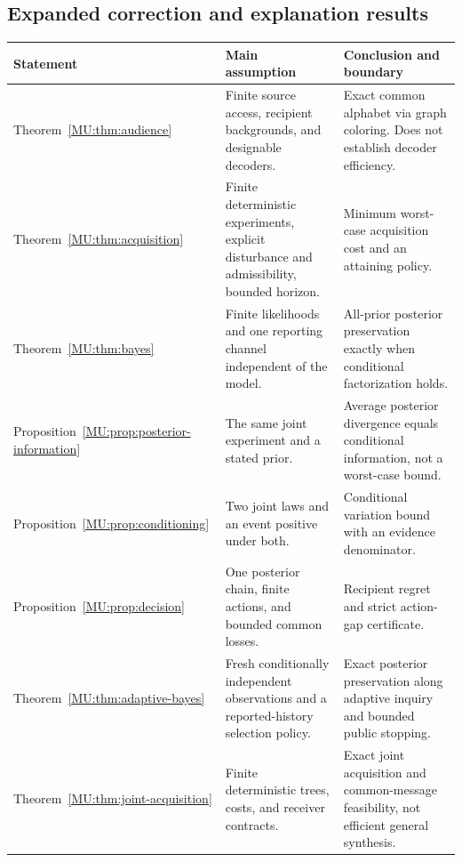 \documentclass[11pt,oneside,openany]{book}
\numberwithin{equation}{section}
\begin{document}
\subsection{Expanded correction and explanation results}
\begin{center}\small
\begin{tabularx}{\textwidth}{@{}P{1.35in}P{1.55in}X@{}}\toprule
Statement & Main assumption & Conclusion and boundary\\\midrule
Theorem~\ref{MU:thm:audience} & Finite source access, recipient backgrounds, and designable decoders. & Exact common alphabet via graph coloring. Does not establish decoder efficiency.\\
Theorem~\ref{MU:thm:acquisition} & Finite deterministic experiments, explicit disturbance and admissibility, bounded horizon. & Minimum worst-case acquisition cost and an attaining policy.\\
Theorem~\ref{MU:thm:bayes} & Finite likelihoods and one reporting channel independent of the model. & All-prior posterior preservation exactly when conditional factorization holds.\\
Proposition~\ref{MU:prop:posterior-information} & The same joint experiment and a stated prior. & Average posterior divergence equals conditional information, not a worst-case bound.\\
Proposition~\ref{MU:prop:conditioning} & Two joint laws and an event positive under both. & Conditional variation bound with an evidence denominator.\\
Proposition~\ref{MU:prop:decision} & One posterior chain, finite actions, and bounded common losses. & Recipient regret and strict action-gap certificate.\\
Theorem~\ref{MU:thm:adaptive-bayes} & Fresh conditionally independent observations and a reported-history selection policy. & Exact posterior preservation along adaptive inquiry and bounded public stopping.\\
Theorem~\ref{MU:thm:joint-acquisition} & Finite deterministic trees, costs, and receiver contracts. & Exact joint acquisition and common-message feasibility, not efficient general synthesis.\\\bottomrule
\end{tabularx}\end{center}
\end{document}
